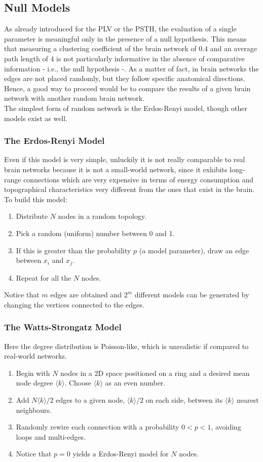 \subsection{Null Models}
As already introduced for the PLV or the PSTH, the evaluation of a single parameter is meaningful only in the
presence of a null hypothesis. This means that measuring a clustering coefficient of the brain network of 0.4
and an average path length of 4 is not particularly informative in the absence of comparative information - i.e.,
the null hypothesis -.
As a matter of fact, in brain networks the edges are not placed randomly, but they follow specific anatomical
directions. Hence, a good way to proceed would be to compare the results of a given brain network with another
random brain network.\\
The simplest form of random network is the Erdos-Renyi model, though other models exist as well.
\subsubsection{The Erdos-Renyi Model}
Even if this model is very simple, unluckily it is not really comparable to real brain networks because
it is not a small-world network, since it exhibits long-range connections which are very expensive in terms
of energy consumption and topographical characteristics very different from the ones that exist in the brain.\\
To build this model:
\begin{enumerate}
    \item Distribute \(N\) nodes in a random topology.
    \item Pick a random (uniform) number between 0 and 1.
    \item If this is greater than the probability \(p\) (a model parameter), draw an edge between
          \(x_i\) and \(x_j\).
    \item Repeat for all the \(N\) nodes.
\end{enumerate}
Notice that \(m\) edges are obtained and \(2^m\) different models can be generated by changing the
vertices connected to the edges.
\subsubsection{The Watts-Strongatz Model}
Here the degree distribution is Poisson-like, which is unrealistic if compared to real-world networks.
\begin{enumerate}
    \item Begin with \(N\) nodes in a 2D space positioned on a ring and a desired mean node
          degree \(\langle{k}\rangle\). Choose \(\langle{k}\rangle\) as an even number.
    \item Add \(N\langle{k}\rangle/2\) edges to a given node, \(\langle{k}\rangle/2\) on each side,
          between its \(\langle{k}\rangle\) nearest neighbours.
    \item Randomly rewire each connection with a probability \(0<p<1\), avoiding loops and multi-edges.
    \item Notice that \(p=0\) yields a Erdos-Renyi model for \(N\) nodes.
\end{enumerate}
